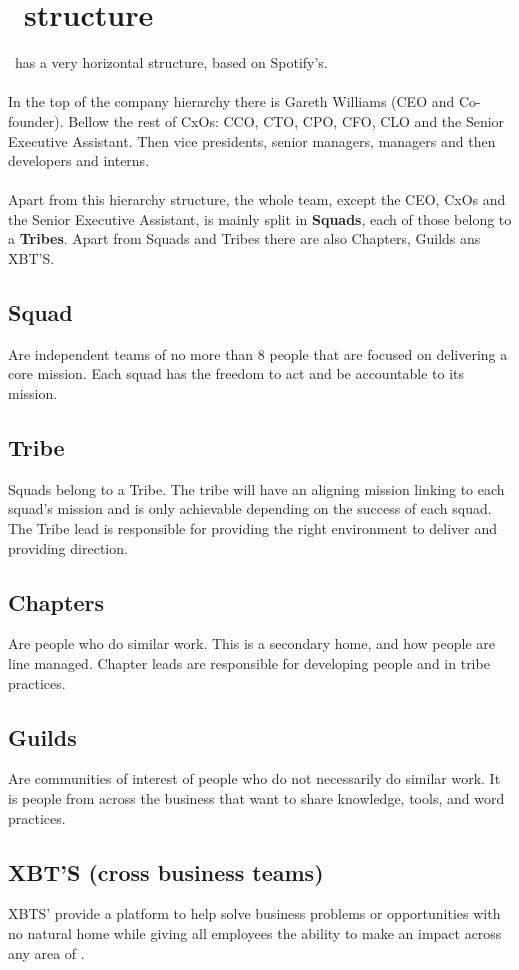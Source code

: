 \chapter{\company\ structure} 

\label{appendix_a}

\company\ has a very horizontal structure, based on Spotify's\cite{culture_of_growth}.
\\\\
In the top of the company hierarchy there is Gareth Williams (CEO and Co-founder). Bellow the rest of CxOs: CCO, CTO, CPO, CFO, CLO and the Senior Executive Assistant. Then vice presidents, senior managers, managers and then developers and interns\cite{crew_chart}.
\\\\
Apart from this hierarchy structure, the whole team, except the CEO, CxOs and the Senior Executive Assistant, is mainly split in \textbf{Squads}, each of those belong to a \textbf{Tribes}. Apart from Squads and Tribes there are also Chapters, Guilds ans XBT'S\cite{how_skyscanner_works}.

\section*{Squad}

Are independent teams of no more than 8 people that are focused on delivering a core mission. Each squad has the freedom to act and be accountable to its mission.

\section*{Tribe}

Squads belong to a Tribe. The tribe will have an aligning mission linking to each squad's mission and is only achievable depending on the success of each squad. The Tribe lead is responsible for providing the right environment to deliver and providing direction. 

\section*{Chapters}

Are people who do similar work. This is a secondary home, and how people are line managed. Chapter leads are responsible for developing people and in tribe practices.

\section*{Guilds}

Are communities of interest of people who do not necessarily do similar work. It is people from across the business that want to share knowledge, tools, and word practices. 

\section*{XBT'S (cross business teams)}

XBTS' provide a platform to help solve business problems or opportunities with no natural home while giving all employees the ability to make an impact across any area of \company.